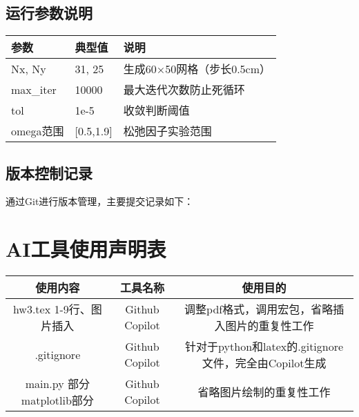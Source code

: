 \documentclass[UTF8]{ctexart}
\begin{document}
\subsection{运行参数说明}
\begin{tabular}{|>{\ttfamily}l|l|p{8cm}|}
    \hline
    \rmfamily 参数 & 典型值 & 说明 \\
    \hline
    Nx, Ny & 31, 25 & 生成60×50网格（步长0.5cm） \\
    max\_iter & 10000 & 最大迭代次数防止死循环 \\
    tol & 1e-5 & 收敛判断阈值 \\
    omega范围 & [0.5,1.9] & 松弛因子实验范围 \\
    \hline
\end{tabular}

\subsection{版本控制记录}
通过Git进行版本管理，主要提交记录如下：

\newpage
\appendix
\section{AI工具使用声明表}
\begin{table}[H]
    \centering
    \begin{tabular}{c|c|c}
        \hline
        使用内容 & 工具名称 & 使用目的 \\ \hline
        hw3.tex 1-9行、图片插入 & Github Copilot & 调整pdf格式，调用宏包，省略插入图片的重复性工作 \\ 
        .gitignore & Github Copilot & 针对于python和latex的.gitignore文件，完全由Copilot生成  \\
        main.py 部分matplotlib部分 & Github Copilot & 省略图片绘制的重复性工作
    \end{tabular}
    \label{tab:AI_tools}
\end{table}
\end{document}
